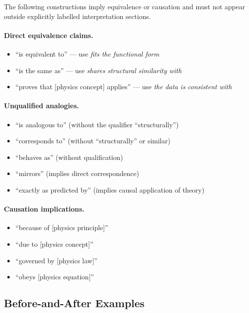 The following constructions imply equivalence or causation and must not
appear outside explicitly labelled interpretation sections.

\paragraph{Direct equivalence claims.}
\begin{itemize}
  \item ``is equivalent to'' --- use \emph{fits the functional form}
  \item ``is the same as'' --- use \emph{shares structural similarity with}
  \item ``proves that [physics concept] applies'' --- use \emph{the data is
        consistent with}
\end{itemize}

\paragraph{Unqualified analogies.}
\begin{itemize}
  \item ``is analogous to'' (without the qualifier ``structurally'')
  \item ``corresponds to'' (without ``structurally'' or similar)
  \item ``behaves as'' (without qualification)
  \item ``mirrors'' (implies direct correspondence)
  \item ``exactly as predicted by'' (implies causal application of theory)
\end{itemize}

\paragraph{Causation implications.}
\begin{itemize}
  \item ``because of [physics principle]''
  \item ``due to [physics concept]''
  \item ``governed by [physics law]''
  \item ``obeys [physics equation]''
\end{itemize}

\subsection{Before-and-After Examples}

